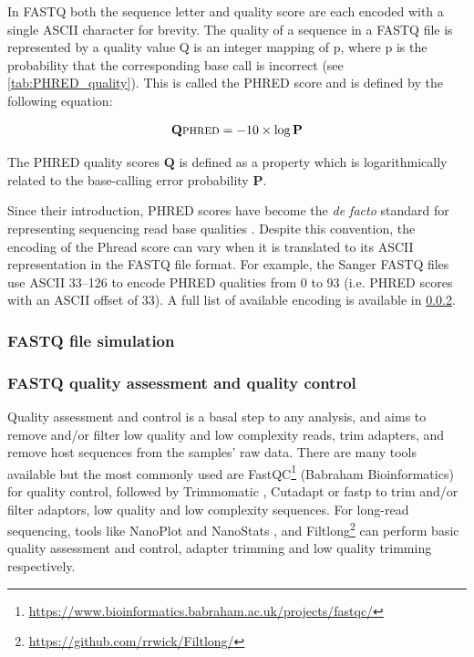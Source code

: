 In FASTQ both the sequence letter and quality score are each encoded with a single ASCII character for brevity. The quality of a sequence in a FASTQ file is represented by a quality value Q is an integer mapping of p, where p is the probability that the corresponding base call is incorrect (see \ref{tab:PHRED_quality}). This is called the PHRED score \citep{ewing_base-calling_1998} and is defined by the following equation:

\begin{equation}
\centering
\mathbf{Q}\textsc{phred} = - 10 \times \log \mathbf{P}
\end{equation}
 
The PHRED quality scores $\mathbf{Q}$ is defined as a property which is logarithmically related to the base-calling error probability $\mathbf{P}$.


Since their introduction, PHRED scores have become the \textit{de facto} standard for representing sequencing read base qualities \citep{cock_sanger_2010}. Despite this convention, the encoding of the Phread score can vary when it is translated to its ASCII representation in the FASTQ file format. For example, the Sanger FASTQ files use ASCII 33–126 to encode PHRED qualities from 0 to 93 (i.e. PHRED scores with an ASCII offset of 33). A full list of available encoding is available in \ref{}. 


\subsubsection{FASTQ file simulation}

\subsubsection{FASTQ quality assessment and quality control}

Quality assessment and control is a basal step to any analysis, and aims to remove and/or filter low quality and low complexity reads, trim adapters, and remove host sequences from the samples’ raw data. There are many tools available but the most commonly used are FastQC\footnote{\url{https://www.bioinformatics.babraham.ac.uk/projects/fastqc/}} (Babraham Bioinformatics) for quality control, followed by Trimmomatic \citep{bolger_trimmomatic_2014}, Cutadapt \citep{martin_cutadapt_2011} or fastp \citep{chen_fastp_2018} to trim and/or filter adaptors, low quality and low complexity sequences. For long-read sequencing, tools like NanoPlot and NanoStats \citep{de_coster_nanopack_2018}, and Filtlong\footnote{\url{https://github.com/rrwick/Filtlong/}} can perform basic quality assessment and control, adapter trimming and low quality trimming respectively. 


